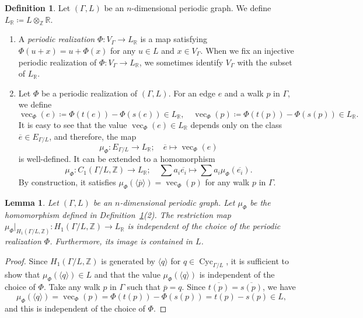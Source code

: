 \documentclass[10pt,a4paper]{amsart}
\theoremstyle{plain}
\newtheorem{lem}[cdrthm]{Lemma}
\theoremstyle{definition}
\newtheorem{defi}[cdrthm]{Definition}
\theoremstyle{remark}
\begin{document}
\begin{defi}\label{defi:pr}
Let $(\Gamma,L)$ be an $n$-dimensional periodic graph.
We define $L_{\mathbb{R}} \coloneqq  L \otimes _{\mathbb{Z}} \mathbb{R}$. 
\begin{enumerate}
\item 
A \textit{periodic realization} $\Phi\colon V_{\Gamma} \to L_{\mathbb{R}}$ is a map satisfying
$\Phi(u+x) = u + \Phi(x)$ for any $u \in L$ and $x \in V _{\Gamma}$. 
When we fix an injective periodic realization of $\Phi\colon V _{\Gamma} \to L_{\mathbb{R}}$, 
we sometimes identify $V _{\Gamma}$ with the subset of $L_{\mathbb{R}}$. 

\item 
Let $\Phi$ be a periodic realization of $(\Gamma, L)$. 
For an edge $e$ and a walk $p$ in $\Gamma$, we define 
\[
\operatorname{vec}_{\Phi}(e) \coloneqq  \Phi(t(e)) - \Phi(s(e)) \in L_{\mathbb{R}}, \quad
\operatorname{vec}_{\Phi}(p) \coloneqq  \Phi(t(p)) - \Phi(s(p)) \in L_{\mathbb{R}}. 
\]
It is easy to see that the value $\operatorname{vec}_{\Phi}(e) \in L_{\mathbb{R}}$ depends only on the class $\overline{e} \in E_{\Gamma /L}$, 
and therefore, 
the map 
\[
\mu _{\Phi} : E_{\Gamma /L} \to L_{\mathbb{R}};\quad \overline{e} \mapsto \operatorname{vec}_{\Phi}(e)
\]
is well-defined. 
It can be extended to a homomorphism 
\[
\mu _{\Phi}: C_1(\Gamma/L, \mathbb{Z}) \to L_{\mathbb{R}}; \quad 
\sum a_i \overline{e_i} \mapsto \sum a_i \mu _{\Phi} (\overline{e_i}). 
\]
By construction, it satisfies $\mu _{\Phi} (\langle \overline{p} \rangle) = \operatorname{vec}_{\Phi}(p)$ for any walk $p$ in $\Gamma$. 
\end{enumerate}
\end{defi}

\setcounter{cdrthm}{6}
\begin{lem}\label{lem:mu}
Let $(\Gamma,L)$ be an $n$-dimensional periodic graph. 
Let $\mu _{\Phi}$ be the homomorphism defined in Definition~\ref{defi:pr}(2). 
The restriction map $\mu_{\Phi} |_{H_1(\Gamma/L, \mathbb{Z})}: H_1(\Gamma/L, \mathbb{Z}) \to L_{\mathbb{R}}$ 
is independent of the choice of the periodic realization $\Phi$. 
Furthermore, its image is contained in $L$. 
\end{lem}
\begin{proof}
Since $H_1(\Gamma/L, \mathbb{Z})$ is generated by $\langle q \rangle$ for $q \in \operatorname{Cyc}_{\Gamma /L}$, 
it is sufficient to show that $\mu_{\Phi} (\langle q \rangle) \in L$ 
and that the value $\mu_{\Phi} (\langle q \rangle)$ is independent of the choice of $\Phi$. 
Take any walk $p$ in $\Gamma$ such that $\overline{p} = q$. 
Since $\overline{t(p)} = \overline{s(p)}$, we have 
\[
\mu_{\Phi} (\langle q \rangle) = \operatorname{vec}_{\Phi}(p) = \Phi(t(p)) - \Phi(s(p)) = t(p) - s(p) \in L, 
\]
and this is independent of the choice of $\Phi$. 
\end{proof}
\end{document}
